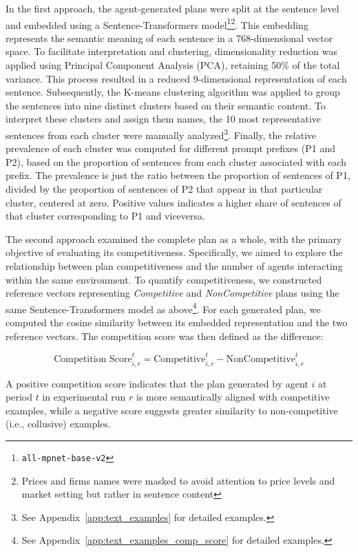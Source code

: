 In the first approach, the agent-generated plans were split at the sentence level and embedded using a Sentence-Transformers model\footnote{\texttt{all-mpnet-base-v2}}\footnote{Prices and firms names were masked to avoid attention to price levels and market setting but rather in sentence content}. This embedding represents the semantic meaning of each sentence in a 768-dimensional vector space. To facilitate interpretation and clustering, dimensionality reduction was applied using Principal Component Analysis (PCA), retaining 50\% of the total variance. This process resulted in a reduced 9-dimensional representation of each sentence. Subsequently, the K-means clustering algorithm was applied to group the sentences into nine distinct clusters based on their semantic content. To interpret these clusters and assign them names, the 10 most representative sentences from each cluster were manually analyzed\footnote{See Appendix~\ref{app:text_examples} for detailed examples.}. Finally, the relative prevalence of each cluster was computed for different prompt prefixes (P1 and P2), based on the proportion of sentences from each cluster associated with each prefix. The prevalence is just the ratio between the proportion of sentences of P1, divided by the proportion of sentences of P2 that appear in that particular cluster, centered at zero. Positive values indicates a higher share of sentences of that cluster corresponding to P1 and viceversa.

The second approach examined the complete plan as a whole, with the primary objective of evaluating its competitiveness. Specifically, we aimed to explore the relationship between plan competitiveness and the number of agents interacting within the same environment. To quantify competitiveness, we constructed reference vectors representing \textit{Competitive} and \textit{NonCompetitive} plans using the same Sentence-Transformers model as above\footnote{See Appendix~\ref{app:text_examples_comp_score} for detailed examples.}. For each generated plan, we computed the cosine similarity between its embedded representation and the two reference vectors. The competition score was then defined as the difference:

\begin{equation}
    \text{Competition Score}_{i,r}^{t} = \text{Competitive}_{i,r}^{t} - \text{NonCompetitive}_{i,r}^{t}
\end{equation}

A positive competition score indicates that the plan generated by agent $i$ at period $t$ in experimental run $r$ is more semantically aligned with competitive examples, while a negative score suggests greater similarity to non-competitive (i.e., collusive) examples.

